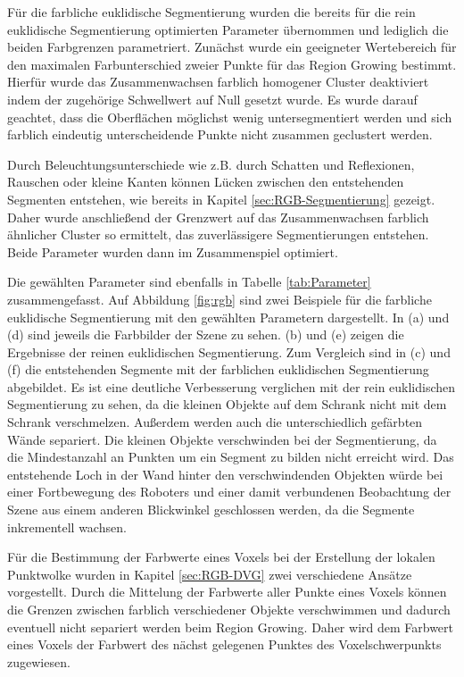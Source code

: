 Für die farbliche euklidische Segmentierung wurden die bereits für die rein eu\-kli\-disch\-e Segmentierung optimierten Parameter übernommen und lediglich die beiden Farbgrenzen parametriert. Zunächst wurde ein geeigneter Wertebereich für den maximalen Farbunterschied zweier Punkte für das Region Growing bestimmt. Hierfür wurde das Zusammenwachsen farblich homogener Cluster deaktiviert indem der zugehörige Schwellwert auf Null gesetzt wurde. Es wurde darauf geachtet, dass die Oberflächen möglichst wenig untersegmentiert werden und sich farblich eindeutig unterscheidende Punkte nicht zusammen geclustert werden.  

Durch Beleuchtungsunterschiede wie z.B. durch Schatten und Reflexionen, Rauschen oder kleine Kanten können Lücken zwischen den entstehenden Segmenten entstehen, wie bereits in Kapitel \ref{sec:RGB-Segmentierung} gezeigt. Daher wurde anschließend der Grenzwert auf das Zusammenwachsen farblich ähnlicher Cluster so ermittelt, das zuverlässigere Segmentierungen entstehen. Beide Parameter wurden dann im Zusammenspiel optimiert. 

Die gewählten Parameter sind ebenfalls in Tabelle \ref{tab:Parameter} zusammengefasst. Auf Abbildung \ref{fig:rgb} sind zwei Beispiele für die farbliche euklidische Segmentierung mit den gewählten Parametern dargestellt. In (a) und (d) sind jeweils die Farbbilder der Szene zu sehen. (b) und (e) zeigen die Ergebnisse der reinen euklidischen Segmentierung. Zum Vergleich sind in (c) und (f) die entstehenden Segmente mit der farblichen euklidischen Segmentierung abgebildet. Es ist eine deutliche Verbesserung verglichen mit der rein euklidischen Segmentierung zu sehen, da die kleinen Objekte auf dem Schrank nicht mit dem Schrank verschmelzen. Außerdem werden auch die unterschiedlich gefärbten Wände separiert. Die kleinen Objekte verschwinden bei der Segmentierung, da die Mindestanzahl an Punkten um ein Segment zu bilden nicht erreicht wird. Das entstehende Loch in der Wand hinter den verschwindenden Objekten würde bei einer Fortbewegung des Roboters und einer damit verbundenen Beobachtung der Szene aus einem anderen Blickwinkel geschlossen werden, da die Segmente inkrementell wachsen. 

Für die Bestimmung der Farbwerte eines Voxels bei der Erstellung der lokalen Punktwolke wurden in Kapitel \ref{sec:RGB-DVG} zwei verschiedene Ansätze vorgestellt. Durch die Mittelung der Farbwerte aller Punkte eines Voxels können die Grenzen zwischen farblich verschiedener Objekte verschwimmen und dadurch eventuell nicht separiert werden beim Region Growing. Daher wird dem Farbwert eines Voxels der Farbwert des nächst gelegenen Punktes des Voxelschwerpunkts zugewiesen. 

